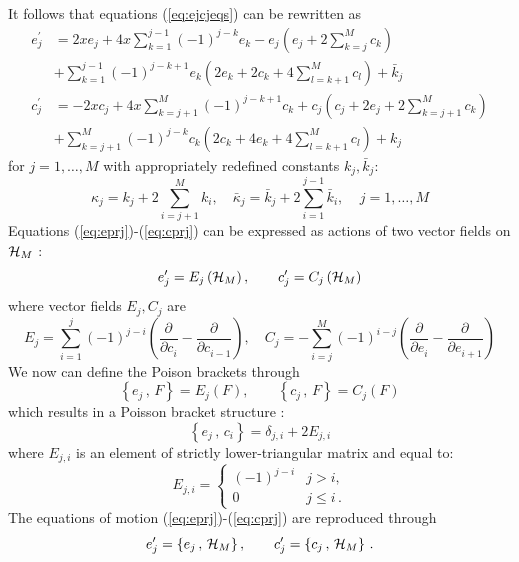 \documentclass[12pt]{article}
\numberwithin{equation}{section}
\def\rf#1{(\ref{eq:#1})}
\def\lab#1{\label{eq:#1}}
\providecommand*{\pder}[3][]{%
\frac{\partial^{#1}#2}{\partial #3^{#1}}}
\begin{document}
It follows that equations \rf{ejcjeqs}  can be rewritten as  
\begin{align}
e^{\prime}_j&=2 x e_j + 4 x \sum_{k=1}^{j-1} (-1)^{j-k} e_k
- e_j \left( e_j+2  \sum_{k=j}^{M} c_k\right) \nonumber \\
&+\sum_{k=1}^{j-1} (-1)^{j-k+1} e_k\left(2 e_k+2c_k+
4  \sum_{l=k+1}^{M} c_l \right) +{\bar k}_j \lab{eprj}\\
c^{\prime}_j&=-2 x c_j + 4 x \sum_{k=j+1}^{M} (-1)^{j-k+1} c_k
+ c_j \left( c_j + 2 e_j+2  \sum_{k=j+1}^{M} c_k\right) \nonumber \\
&+\sum_{k=j+1}^{M} (-1)^{j-k} c_k\left(2 c_k+4e_k+
4  \sum_{l=k+1}^{M} c_l \right) +{k}_j \lab{cprj}
\end{align}
for $j=1, {\ldots} , M$ with appropriately redefined constants $k_j,
{\bar k}_j$:
\[
\kappa_j=k_j+2 \sum_{i=j+1}^M k_i, \quad
{\bar \kappa}_j={\bar k}_j+2 \sum_{i=1}^{j-1} {\bar k}_i,\;\;\;\;
j=1,{\ldots} , M
\]
Equations \rf{eprj}-\rf{cprj} can be expressed as 
actions of two vector fields on ${\cal H}_M$ :
\begin{equation}
e^{\prime}_j= E_j \left( {\cal H}_M \right), \qquad
c^{\prime}_j=C_j \left( {\cal H}_M \right)
\lab{ecjhm}
\end{equation}
where vector fields $ E_j , C_j$ are
\begin{equation}
E_j = \sum_{i=1}^{j} (-1)^{j-i}
\left( \pder{}{c_i}- \pder{}{c_{i-1}} \right) ,\quad C_j = - \sum_{i=j}^{M}  (-1)^{i-j} \left( \pder{}{e_i} - \pder{}{e_{i+1}} \right)
\lab{ectflds}
\end{equation}
We now can define the Poison brackets through
\begin{equation}
\left\{ e_j \, ,\, F\right\}= E_j \left( F \right), \qquad
\left\{ c_j \, ,\, F\right\}=
C_j \left( F \right)
\lab{pbec}
\end{equation}
which results in a Poisson bracket structure :
\begin{equation}
\left\{ e_j \, ,\, c_i \right\}= \delta_{j,i}+2 E_{j,i}
\lab{pbarray}
\end{equation}
where $E_{j,i}$ is an element of strictly lower-triangular matrix
and equal to:
\[
E_{j,i}=\begin{cases} (-1)^{j-i} &  j>i, \\
 0 & j \le i \, .
\end{cases} 
\]
The equations of motion \rf{eprj}-\rf{cprj} are reproduced through
\begin{equation}
e_j^{\prime} = \left\{ e_j \, ,\, {\cal H}_M  \right\}, \qquad
c_j^{\prime} = \left\{ c_j \, ,\, {\cal H}_M  \right\}\, .
\lab{pbhamm}
\end{equation}
\end{document}
